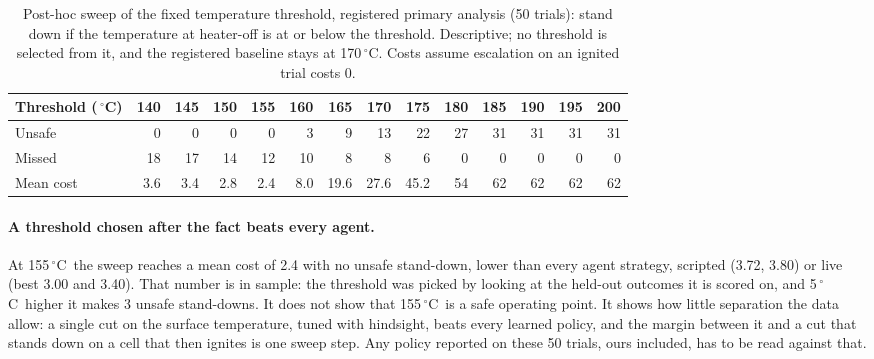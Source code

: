 \documentclass[11pt]{article}
\newcommand{\degC}{\,$^\circ$C}
\begin{document}
\begin{table}[t]
\centering\small
\caption{Post-hoc sweep of the fixed temperature threshold, registered primary analysis (50 trials): stand down if
the temperature at heater-off is at or below the threshold. Descriptive; no threshold is selected from it, and the
registered baseline stays at 170\degC. Costs assume escalation on an ignited trial costs 0.}
\label{tab:sweep}
\setlength{\tabcolsep}{5pt}
\begin{tabular}{@{}lrrrrrrrrrrrrr@{}}
\toprule
Threshold (\degC) & 140 & 145 & 150 & 155 & 160 & 165 & 170 & 175 & 180 & 185 & 190 & 195 & 200 \\
\midrule
Unsafe & 0 & 0 & 0 & 0 & 3 & 9 & 13 & 22 & 27 & 31 & 31 & 31 & 31 \\
Missed & 18 & 17 & 14 & 12 & 10 & 8 & 8 & 6 & 0 & 0 & 0 & 0 & 0 \\
Mean cost & 3.6 & 3.4 & 2.8 & 2.4 & 8.0 & 19.6 & 27.6 & 45.2 & 54 & 62 & 62 & 62 & 62 \\
\bottomrule
\end{tabular}
\end{table}

\paragraph{A threshold chosen after the fact beats every agent.} At 155\degC\ the sweep reaches a mean cost of 2.4
with no unsafe stand-down, lower than every agent strategy, scripted (3.72, 3.80) or live (best 3.00 and 3.40). That number is
in sample: the threshold was picked by looking at the held-out outcomes it is scored on, and 5\degC\ higher it makes
3 unsafe stand-downs. It does not show that 155\degC\ is a safe operating point. It shows how little separation the
data allow: a single cut on the surface temperature, tuned with hindsight, beats every learned policy, and the
margin between it and a cut that stands down on a cell that then ignites is one sweep step. Any policy reported on
these 50 trials, ours included, has to be read against that.
\end{document}
